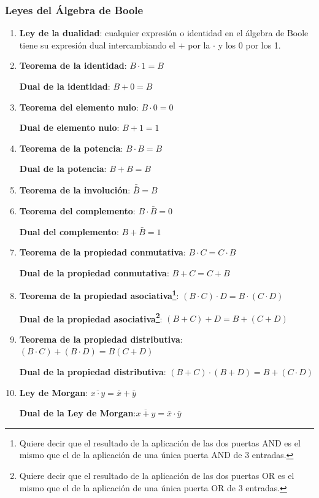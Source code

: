 \documentclass[a4paper,10pt]{book}
\begin{document}
\subsubsection*{Leyes del Álgebra de Boole}
\begin{enumerate}
\item \textbf{Ley de la dualidad}: cualquier expresión o identidad en el álgebra de Boole tiene su expresión dual intercambiando el $+$ por la $\cdot$ y los 0 por los 1.

\item \textbf{Teorema de la identidad}: $B\cdot1=B$\par
\textbf{Dual de la identidad}: $B+0=B$

\item \textbf{Teorema del elemento nulo}: $B\cdot 0=0$\par
\textbf{Dual de elemento nulo}: $B+1=1$
 
\item \textbf{Teorema de la potencia}: $B\cdot B=B$\par
\textbf{Dual de la potencia}: $B+B=B$  

\item \textbf{Teorema de la involución}: $\bar{\bar{B}}=B$

\item \textbf{Teorema del complemento}: $B\cdot \bar{B}=0$\par
\textbf{Dual del complemento}: $B+\bar{B}=1$

\item \textbf{Teorema de la propiedad conmutativa}: $B\cdot C=C\cdot B$\par
\textbf{Dual de la propiedad conmutativa}: $B+C=C+B$

\item \textbf{Teorema de la propiedad asociativa\footnote{Quiere decir que el resultado de la aplicación de las dos puertas AND es el mismo que el de la aplicación de una única puerta AND de 3 entradas.}}: $(B\cdot C)\cdot D=B\cdot (C\cdot D)$\par
\textbf{Dual de la propiedad asociativa\footnote{Quiere decir que el resultado de la aplicación de las dos puertas OR es el mismo que el de la aplicación de una única puerta OR de 3 entradas.
 }}: $(B+C)+D=B+(C+D)$

\item \textbf{Teorema de la propiedad distributiva}:$(B\cdot C)+(B\cdot D)=B(C+D)$\par
\textbf{Dual de la propiedad distributiva}: $(B+C)\cdot (B+D)=B+(C\cdot D)$ 

\item \textbf{Ley de Morgan}: $\overline{x\cdot y}=\bar{x}+\bar{y}$\par
\textbf{Dual de la Ley de Morgan}:$\overline{x+y}=\bar{x}\cdot\bar{y}$ 
\end{enumerate}
\end{document}
